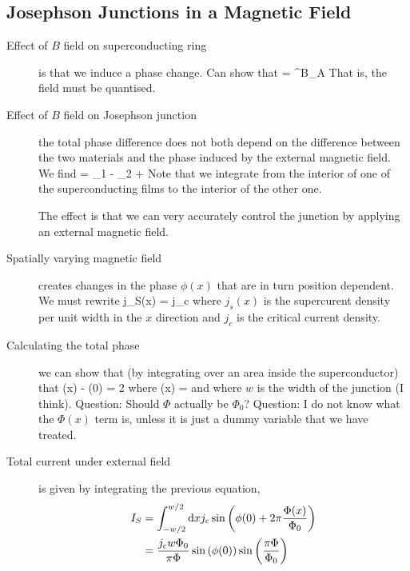 \subsection{Josephson Junctions in a Magnetic Field}
\begin{description}
\item[Effect of $B$ field on superconducting ring ] is that we induce a phase change. Can show that 
\beq
\Delta \phi =  \int^B_A  \cdot \intd {}
\eeq
That is, the field must be quantised. 

\item[Effect of $B$ field on Josephson junction] the total phase difference does not both depend on the difference between the two materials and the phase induced by the external magnetic field. We find
\beq
\phi = \phi_1 - \phi_2 +  \int {} \cdot \intd {}
\eeq
Note that we integrate from the interior of one of the superconducting films to the interior of the other one. 

The effect is that we can very accurately control the junction by applying an external magnetic field. 

\item[Spatially varying magnetic field] creates changes in the phase $\phi(x)$ that are in turn position dependent. We must rewrite
\beq
j_S(x) = j_c 
\eeq
where $j_s(x)$ is the supercurent density per unit width in the $x$ direction and $j_c$ is the  critical current density. 

\item[Calculating the total phase] we can show that (by integrating over an area inside the superconductor) that
\beq
\phi(x) - \phi(0) = 2\pi {}
\eeq
where
\beq
\Phi(x) = 
\eeq
and where $w$ is the width of the junction (I think). 
Question: Should $\Phi$ actually be $\Phi_0$? 
Question: I do not know what the $\Phi(x)$ term is, unless it is just a dummy variable that we have treated. 

\item[Total current under external field] is given by integrating the previous equation, 
\begin{align}
I_S &= \int^{w/2}_{- w/2} \mathrm{d} x j_c \sin{\left( \phi(0) + 2 \pi \frac{\Phi(x)}{\Phi_0} \right)} \\
&= \frac{j_c w \Phi_0}{\pi \Phi} \sin{\left( \phi(0)\right)} \sin{\left( \frac{\pi \Phi}{\Phi_0} \right) }
\end{align}


\end{description}
